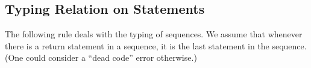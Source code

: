 


\subsection{Typing Relation on Statements}

The following rule deals with the typing of sequences. We assume that
whenever there is a return statement in a sequence, it is the last statement in
the sequence. (One could consider a ``dead code'' error otherwise.)

